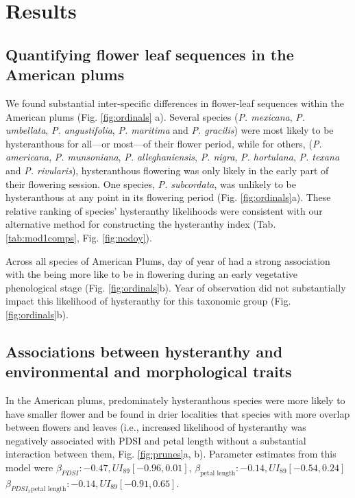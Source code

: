 \documentclass{article}[12pt]
\begin{document}
{\section*{Results}
\subsection*{Quantifying flower leaf sequences in the American plums}
We found substantial inter-specific differences in flower-leaf sequences within the American plums (Fig. \ref{fig:ordinals} a). Several species (\emph{P. mexicana}, \textit{P. umbellata}, \textit{P. angustifolia}, \textit{P. maritima} and \textit{P. gracilis}) were most likely to be hysteranthous for all---or most---of their flower period, while for others, (\textit{P. americana}, \textit{P. munsoniana}, \textit{P. alleghaniensis}, \textit{P. nigra}, \textit{P. hortulana}, \textit{P. texana} and \textit{P. rivularis}), hysteranthous flowering was only likely in the early part of their flowering session. One species, \emph{P. subcordata}, was unlikely to be hysteranthous at any point in its flowering period (Fig. \ref{fig:ordinals}a). These relative ranking of species' hysteranthy likelihoods were consistent with our alternative method for constructing the hysteranthy index (Tab. \ref{tab:mod1comps}, Fig. \ref{fig:nodoy}).

Across all species of American Plums, day of year of had a strong association with the being more like to be in flowering during an early vegetative phenological stage (Fig. \ref{fig:ordinals}b). Year of observation did not substantially impact this likelihood of hysteranthy for this taxonomic group (Fig. \ref{fig:ordinals}b).

 
\subsection*{Associations between hysteranthy and environmental and morphological traits}
In the American plums, predominately hysteranthous species were more likely to have smaller flower and be found in drier localities that species with more overlap between flowers and leaves (i.e., increased likelihood of hysteranthy was negatively associated with PDSI and petal length without a substantial interaction between them, Fig. \ref{fig:prunes}a, b). Parameter estimates from this model were  $\beta_{PDSI}: -0.47, UI_{89}[-0.96, 0.01]$, $\beta_{\text{petal length}}: -0.14,UI_{89}[ -0.54, 0.24]$  $\beta_{PDSI_x \text{petal length}}: -0.14,UI_{89}[ -0.91, 0.65]$.

}
\end{document}
